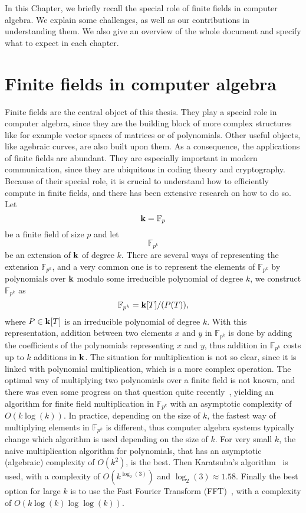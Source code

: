In this Chapter, we briefly recall the special role of finite fields in computer
algebra. We explain some challenges, as well as our contributions in
understanding them. We also give an overview of the whole document and specify
what to expect in each chapter.
\minitoc
\clearpage

\section{Finite fields in computer algebra}

Finite fields are the central object of this thesis. They play a special role in
computer algebra, since they are the building block of more complex structures
like for example vector spaces of matrices or of polynomials. Other useful
objects, like agebraic curves, are also built upon them. As a consequence, the
applications of finite fields are abundant. They are especially important in
modern communication, since they are ubiquitous in coding theory and
cryptography. Because of their special role, it is crucial to
understand how to efficiently compute in finite fields, and there has been
extensive research on how to do so. Let 
\[
  \mathbf{k} = \mathbb{F}_{p}
\]
be a finite field of size $p$ and let 
\[
  \mathbb{F}_{p^k}
\]
be an extension of $\mathbf{k}$ of degree $k$. There are several ways of representing
the extension $\mathbb{F}_{p^{k}}$, and a very common one is to represent the
elements of $\mathbb{F}_{p^{k}}$ by polynomials over $\mathbf{k}$ modulo some
irreducible polynomial of degree $k$, \ie we construct $\mathbb{F}_{p^{k}}$ as
\[
  \mathbb{F}_{p^{k}} = \mathbf{k}[T]/(P(T)),
\]
where $P\in\mathbf{k}[T]$ is an irreducible polynomial of degree $k$. With this
representation, addition between two elements $x$ and $y$ in
$\mathbb{F}_{p^{k}}$ is done by adding the coefficients of the polynomials
representing $x$ and $y$, thus addition in $\mathbb{F}_{p^{k}}$ costs up to $k$
additions in $\mathbf{k}$. The situation for multiplication is not so clear, since it is
linked with polynomial multiplication, which is a more complex operation. The
optimal way of multiplying two polynomials over a finite field is not known, and
there was even some progress on that question quite recently~\cite{HVDH19ff},
yielding an algorithm for finite field multiplication in
$\mathbb{F}_{p^{k}}$ with an asymptotic complexity of $O(k\log(k))$.
In practice, depending on the size of $k$, the fastest way of multiplying
elements in
$\mathbb{F}_{p^k}$ is different, thus computer algebra systems typically change
which algorithm is used depending on the size of $k$. For very small $k$, the
naive multiplication algorithm for polynomials, that has an asymptotic
(algebraic) complexity of $O(k^2)$, is the best. Then Karatsuba's
algorithm~\cite{Karatsuba63} is used, with a complexity of $O(k^{\log_2(3)})$
and $\log_2(3)\approx1.58$. Finally the best option for
large $k$ is to use the Fast Fourier Transform (FFT)~\cite{CT65, SS71}, with a
complexity of $O(k\log(k)\log\log(k))$.

